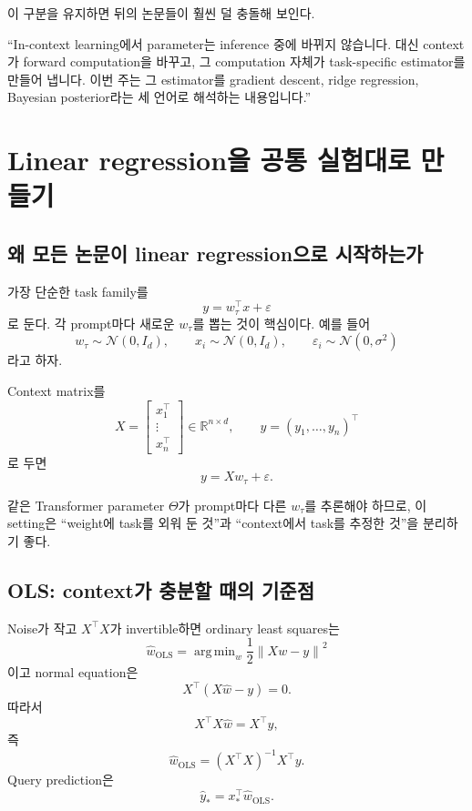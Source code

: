 \documentclass[11pt,a4paper,oneside,openany]{memoir}
\newcommand{\R}{\mathbb{R}}
\newcommand{\norm}[1]{\left\lVert #1\right\rVert}
\DeclareMathOperator*{\argmin}{arg\,min}
\theoremstyle{definition}
\begin{document}
이 구분을 유지하면 뒤의 논문들이 훨씬 덜 충돌해 보인다.

\begin{presentbox}
``In-context learning에서 parameter는 inference 중에 바뀌지 않습니다. 대신 context가 forward computation을 바꾸고, 그 computation 자체가 task-specific estimator를 만들어 냅니다. 이번 주는 그 estimator를 gradient descent, ridge regression, Bayesian posterior라는 세 언어로 해석하는 내용입니다.''
\end{presentbox}

\chapter{Linear regression을 공통 실험대로 만들기}

\section{왜 모든 논문이 linear regression으로 시작하는가}

가장 단순한 task family를
\[
y=w_\tau^\top x+\varepsilon
\]
로 둔다. 각 prompt마다 새로운 $w_\tau$를 뽑는 것이 핵심이다.
예를 들어
\[
w_\tau\sim\mathcal N(0,I_d),
\qquad
x_i\sim\mathcal N(0,I_d),
\qquad
\varepsilon_i\sim\mathcal N(0,\sigma^2)
\]
라고 하자.

Context matrix를
\[
X=
\begin{bmatrix}
x_1^\top\\
\vdots\\
x_n^\top
\end{bmatrix}\in\R^{n\times d},
\qquad
y=(y_1,\ldots,y_n)^\top
\]
로 두면
\[
y=Xw_\tau+\varepsilon.
\]

같은 Transformer parameter $\Theta$가 prompt마다 다른 $w_\tau$를 추론해야 하므로,
이 setting은 ``weight에 task를 외워 둔 것''과 ``context에서 task를 추정한 것''을 분리하기 좋다.

\section{OLS: context가 충분할 때의 기준점}

Noise가 작고 $X^\top X$가 invertible하면 ordinary least squares는
\[
\hat w_{\mathrm{OLS}}
=
\argmin_w\frac12\norm{Xw-y}^2
\]
이고 normal equation은
\[
X^\top(X\hat w-y)=0.
\]
따라서
\[
X^\top X\hat w=X^\top y,
\]
즉
\[
\boxed{
\hat w_{\mathrm{OLS}}=(X^\top X)^{-1}X^\top y
}.
\]
Query prediction은
\[
\hat y_*=x_*^\top\hat w_{\mathrm{OLS}}.
\]
\end{document}

